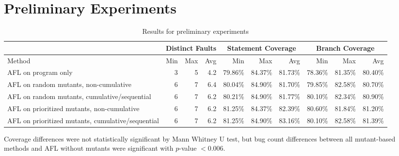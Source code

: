 \section{Preliminary Experiments}

\begin{table*}
  \begin{centering}
  \begin{tabular}{l||r|r|r||r|r|r||r|r|r}
    & \multicolumn{3}{|c||}{Distinct Faults} & \multicolumn{3}{|c||}{Statement Coverage} &
                                                                    \multicolumn{3}{|c}{Branch Coverage} \\
    \hline
  Method & Min & Max  & Avg & Min & Max & Avg
                                                                  
  & Min & Max & Avg \\
    \hline
    \hline
  AFL on program only & 3 & 5 & 4.2 & 79.86\% & 84.37\% & 81.73\% &
                                                                    78.36\%
                                  & 81.35\% & 80.40\%\\
    \hline
    \hline
  AFL on random mutants, non-cumulative  & 6 & 7 & 6.4 & 80.04\% &
                                                                   84.90\%
                      & 81.70\% & 79.85\% & 82.58\% & 80.70\%\\
  \hline
  AFL on random mutants, cumulative/sequential & 6 & 7 & 6.2 & 80.21\%
                                                               &
                                                                 84.90\%
                      & 81.77\%
                            & 80.10\% & 82.34\% & 80.90\%\\
    \hline
    \hline
    AFL on prioritized mutants, non-cumulative  & 6 & 7 & 6.2 &
                                                                81.25\%
               & 84.37\% & 82.39\% & 80.60\% & 81.84\% & 81.20\% \\
    \hline
    AFL on prioritized mutants, cumulative/sequential  & 6 & 7 & 6.2 &
    81.25\% & 84.90\% & 83.16\% & 80.10\% & 82.58\% & 81.39\%\\    
  \hline
  \end{tabular}
  \end{centering}
\caption{Results for preliminary experiments}
\end{table*}

Coverage differences were not statistically significant by Mann
Whitney U test, but bug count differences between all mutant-based methods and AFL
without mutants were significant with $p$-value $< 0.006$.